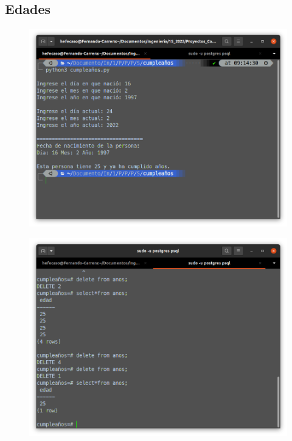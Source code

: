 \documentclass[12pt,letterpaper]{article}
\begin{document}
\begin{multicols}{2}

\section{Edades}

\begin{figure}[H]
\centering
\includegraphics[width = \columnwidth]{1-1.png}
\end{figure}


\begin{figure}[H]
\centering
\includegraphics[width = \columnwidth]{1-2.png}
\end{figure}



\end{multicols}
\end{document}
